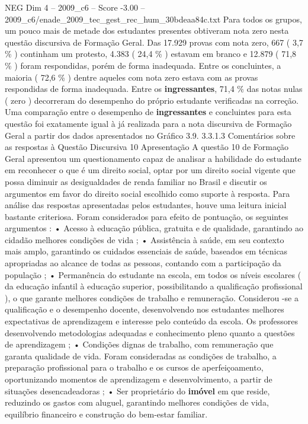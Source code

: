 \begin{textsample}{NEG Dim 4 – 2009\_c6 – Score -3.00 – 2009\_c6/enade\_2009\_tec\_gest\_rec\_hum\_30bdeaa84c.txt}
Para todos os grupos, um pouco mais de metade dos estudantes presentes obtiveram nota zero nesta questão discursiva de Formação Geral.
Das 17.929 provas com nota zero, 667 ( 3,7 \% ) continham um protesto, 4.383 ( 24,4 \% ) estavam em branco e 12.879 ( 71,8 \% ) foram respondidas, porém de forma inadequada.
Entre os concluintes, a maioria ( 72,6 \% ) dentre aqueles com nota zero estava com as provas respondidas de forma inadequada.
Entre os \textbf{ingressantes}, 71,4 \% das notas nulas ( zero ) decorreram do desempenho do próprio estudante verificadas na correção.
Uma comparação entre o desempenho de \textbf{ingressantes} e concluintes para esta questão foi exatamente igual à já realizada para a nota discursiva de Formação Geral a partir dos dados apresentados no Gráfico 3.9. 3.3.1.3 Comentários sobre as respostas à Questão Discursiva 10 Apresentação A questão 10 de Formação Geral apresentou um questionamento capaz de analisar a habilidade do estudante em reconhecer o que é um direito social, optar por um direito social vigente que possa diminuir as desigualdades de renda familiar no Brasil e discutir os argumentos em favor do direito social escolhido como suporte à resposta.
Para análise das respostas apresentadas pelos estudantes, houve uma leitura inicial bastante criteriosa.
Foram considerados para efeito de pontuação, os seguintes argumentos : • Acesso à educação pública, gratuita e de qualidade, garantindo ao cidadão melhores condições de vida ; • Assistência à saúde, em seu contexto mais amplo, garantindo os cuidados essenciais de saúde, baseados em técnicas apropriadas ao alcance de todas as pessoas, contando com a participação da população ; • Permanência do estudante na escola, em todos os níveis escolares ( da educação infantil à educação superior, possibilitando a qualificação profissional ), o que garante melhores condições de trabalho e remuneração.
Considerou -se a qualificação e o desempenho docente, desenvolvendo nos estudantes melhores expectativas de aprendizagem e interesse pelo conteúdo da escola.
Os professores desenvolvendo metodologias adequadas e conhecimento pleno quanto a questões de aprendizagem ; • Condições dignas de trabalho, com remuneração que garanta qualidade de vida.
Foram consideradas as condições de trabalho, a preparação profissional para o trabalho e os cursos de aperfeiçoamento, oportunizando momentos de aprendizagem e desenvolvimento, a partir de situações desencadeadoras ; • Ser proprietário do \textbf{imóvel} em que reside, reduzindo os gastos com aluguel, garantindo melhores condições de vida, equilíbrio financeiro e construção do bem-estar familiar.

\end{textsample}
